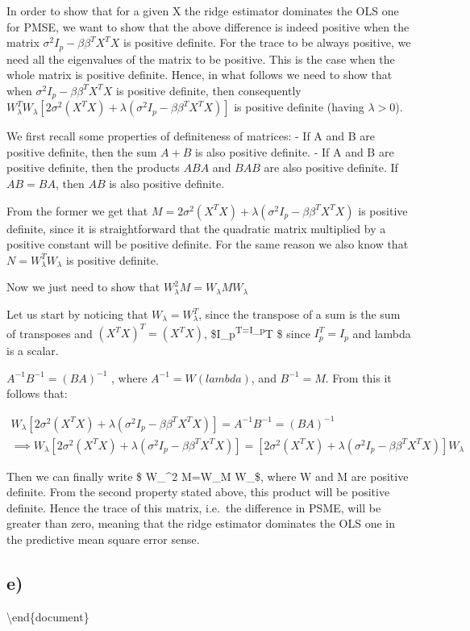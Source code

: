 \documentclass[
]{article}
\begin{document}
In order to show that for a given X the ridge estimator dominates the
OLS one for PMSE, we want to show that the above difference is indeed
positive when the matrix \(\sigma^2I_p-\beta\beta^TX^TX\) is positive
definite. For the trace to be always positive, we need all the
eigenvalues of the matrix to be positive. This is the case when the
whole matrix is positive definite. Hence, in what follows we need to
show that when \(\sigma^2I_p-\beta\beta^TX^TX\) is positive definite,
then consequently
\(W_\lambda^TW_\lambda[2\sigma^2(X^TX)+\lambda(\sigma^2I_p-\beta\beta^TX^TX)]\)
is positive definite (having \(\lambda >0\)).

We first recall some properties of definiteness of matrices: - If A and
B are positive definite, then the sum \(A + B\) is also positive
definite. - If A and B are positive definite, then the products \(ABA\)
and \(BAB\) are also positive definite. If \(AB = BA\), then \(AB\) is
also positive definite.

From the former we get that
\(M=2\sigma^2(X^TX)+\lambda(\sigma^2I_p-\beta\beta^TX^TX)\) is positive
definite, since it is straightforward that the quadratic matrix
multiplied by a positive constant will be positive definite. For the
same reason we also know that \(N=W_\lambda^TW_{\lambda}\) is positive
definite.

Now we just need to show that \(W_\lambda^2 M=W_\lambda M W_{\lambda}\)

Let us start by noticing that \(W_{\lambda}=W_{\lambda}^T\), since the
transpose of a sum is the sum of transposes and \((X^TX)^T=(X^TX)\),
\$\lambda I\_p\textsuperscript{T=\lambda I\_p}T \$ since \(I_p^T=I_p\)
and lambda is a scalar.

\(A^{-1} B^{-1} =(BA)^{-1}\) , where \(A^{-1} = W(lambda)\), and
\(B^{-1}= M\). From this it follows that:

\begin{gather*}

    W_\lambda[2\sigma^2(X^TX)+\lambda(\sigma^2I_p-\beta\beta^TX^TX)]= A^{-1} B^{-1}
    =(BA)^{-1} \\
    \implies  W_\lambda[2\sigma^2(X^TX)+\lambda(\sigma^2I_p-\beta\beta^TX^TX)]=[2\sigma^2(X^TX)+\lambda(\sigma^2I_p-\beta\beta^TX^TX)]W_\lambda
    
\end{gather*}

Then we can finally write \$ W\_\lambda\^{}2 M=W\_\lambda M
W\_\lambda\$, where W and M are positive definite. From the second
property stated above, this product will be positive definite. Hence the
trace of this matrix, i.e.~the difference in PSME, will be greater than
zero, meaning that the ridge estimator dominates the OLS one in the
predictive mean square error sense.

\hypertarget{e}{%
\subsection{e)}\label{e}}

\textbackslash end\{document\}
\end{document}
